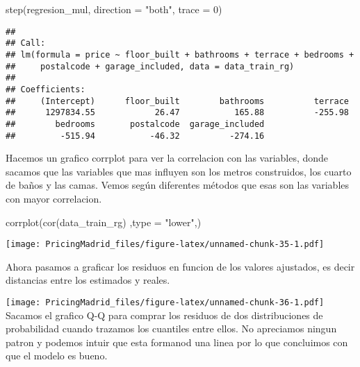\documentclass[
]{article}
\newenvironment{Shaded}{\begin{snugshade}}{\end{snugshade}}
\newcommand{\AttributeTok}[1]{\textcolor[rgb]{0.77,0.63,0.00}{#1}}
\newcommand{\DecValTok}[1]{\textcolor[rgb]{0.00,0.00,0.81}{#1}}
\newcommand{\FunctionTok}[1]{\textcolor[rgb]{0.00,0.00,0.00}{#1}}
\newcommand{\NormalTok}[1]{#1}
\newcommand{\SpecialCharTok}[1]{\textcolor[rgb]{0.00,0.00,0.00}{#1}}
\newcommand{\StringTok}[1]{\textcolor[rgb]{0.31,0.60,0.02}{#1}}
\begin{document}
\begin{Shaded}
\begin{Highlighting}[]
\FunctionTok{step}\NormalTok{(regresion\_mul, }\AttributeTok{direction =} \StringTok{"both"}\NormalTok{, }\AttributeTok{trace =} \DecValTok{0}\NormalTok{)}
\end{Highlighting}
\end{Shaded}

\begin{verbatim}
## 
## Call:
## lm(formula = price ~ floor_built + bathrooms + terrace + bedrooms + 
##     postalcode + garage_included, data = data_train_rg)
## 
## Coefficients:
##     (Intercept)      floor_built        bathrooms          terrace  
##      1297834.55            26.47           165.88          -255.98  
##        bedrooms       postalcode  garage_included  
##         -515.94           -46.32          -274.16
\end{verbatim}

Hacemos un grafico corrplot para ver la correlacion con las variables,
donde sacamos que las variables que mas influyen son los metros
construidos, los cuarto de baños y las camas. Vemos según diferentes
métodos que esas son las variables con mayor correlacion.

\begin{Shaded}
\begin{Highlighting}[]
\FunctionTok{corrplot}\NormalTok{(}\FunctionTok{cor}\NormalTok{(data\_train\_rg) ,}\AttributeTok{type =} \StringTok{"lower"}\NormalTok{,)}
\end{Highlighting}
\end{Shaded}

\texttt{[image: PricingMadrid\_files/figure-latex/unnamed-chunk-35-1.pdf]}

Ahora pasamos a graficar los residuos en funcion de los valores
ajustados, es decir distancias entre los estimados y reales.

\begin{Shaded}
\end{Shaded}

\texttt{[image: PricingMadrid\_files/figure-latex/unnamed-chunk-36-1.pdf]}
Sacamos el grafico Q-Q para comprar los residuos de dos distribuciones
de probabilidad cuando trazamos los cuantiles entre ellos. No apreciamos
ningun patron y podemos intuir que esta formanod una linea por lo que
concluimos con que el modelo es bueno.
\end{document}
